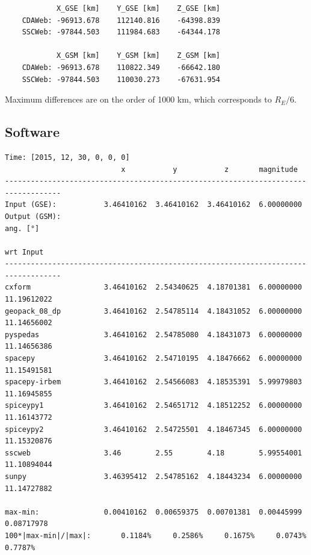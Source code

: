\documentclass[draft]{agujournal2019}
\begin{document}
\begin{verbatim}
            X_GSE [km]    Y_GSE [km]    Z_GSE [km]
    CDAWeb: -96913.678    112140.816    -64398.839
    SSCWeb: -97844.503    111984.683    -64344.178

            X_GSM [km]    Y_GSM [km]    Z_GSM [km]
    CDAWeb: -96913.678    110822.349    -66642.180
    SSCWeb: -97844.503    110030.273    -67631.954
\end{verbatim}

Maximum differences are on the order of 1000 km, which corresponds to $R_E/6$.


\subsection{Software}
\label{sect:comparisons_software}

\small
\begin{verbatim}
Time: [2015, 12, 30, 0, 0, 0]
                           x           y           z       magnitude
-----------------------------------------------------------------------------------
Input (GSE):           3.46410162  3.46410162  3.46410162  6.00000000
Output (GSM):                                                         ang. [°]
                                                                      wrt Input
-----------------------------------------------------------------------------------
cxform                 3.46410162  2.54340625  4.18701381  6.00000000 11.19612022
geopack_08_dp          3.46410162  2.54785114  4.18431052  6.00000000 11.14656002
pyspedas               3.46410162  2.54785080  4.18431073  6.00000000 11.14656386
spacepy                3.46410162  2.54710195  4.18476662  6.00000000 11.15491581
spacepy-irbem          3.46410162  2.54566083  4.18535391  5.99979803 11.16945855
spiceypy1              3.46410162  2.54651712  4.18512252  6.00000000 11.16143772
spiceypy2              3.46410162  2.54725501  4.18467345  6.00000000 11.15320876
sscweb                 3.46        2.55        4.18        5.99554001 11.10894044
sunpy                  3.46395412  2.54785162  4.18443234  6.00000000 11.14727882

max-min:               0.00410162  0.00659375  0.00701381  0.00445999  0.08717978
100*|max-min|/|max|:       0.1184%     0.2586%     0.1675%     0.0743%     0.7787%
\end{verbatim}
\normalsize
\end{document}

